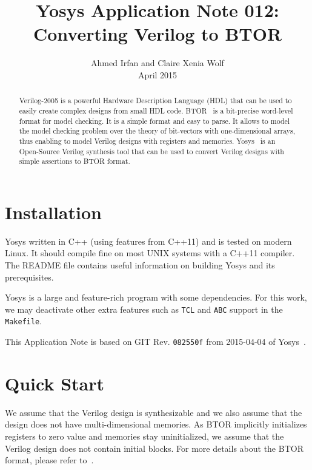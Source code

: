 \documentclass[9pt,technote,a4paper]{IEEEtran}
\begin{document}
\title{Yosys Application Note 012: \\ Converting Verilog to BTOR}
\author{Ahmed Irfan and Claire Xenia Wolf \\ April 2015}
\maketitle

\begin{abstract}
Verilog-2005 is a powerful Hardware Description Language (HDL) that
can be used to easily create complex designs from small HDL code.
BTOR~\cite{btor} is a bit-precise word-level format for model
checking.  It is a simple format and easy to parse. It allows to model
the model checking problem over the theory of bit-vectors with
one-dimensional arrays, thus enabling to model Verilog designs with
registers and memories.  Yosys~\cite{yosys} is an Open-Source Verilog
synthesis tool that can be used to convert Verilog designs with simple
assertions to BTOR format.

\end{abstract}

\section{Installation}

Yosys written in C++ (using features from C++11) and is tested on
modern Linux.  It should compile fine on most UNIX systems with a
C++11 compiler. The README file contains useful information on
building Yosys and its prerequisites.

Yosys is a large and feature-rich program with some dependencies. For
this work, we may deactivate other extra features such as {\tt TCL}
and {\tt ABC} support in the {\tt Makefile}.

\bigskip

This Application Note is based on GIT Rev. {\tt 082550f} from
2015-04-04 of Yosys~\cite{yosys}.

\section{Quick Start}

We assume that the Verilog design is synthesizable and we also assume
that the design does not have multi-dimensional memories.  As BTOR
implicitly initializes registers to zero value and memories stay
uninitialized, we assume that the Verilog design does
not contain initial blocks. For more details about the BTOR format,
please refer to~\cite{btor}.
\end{document}
